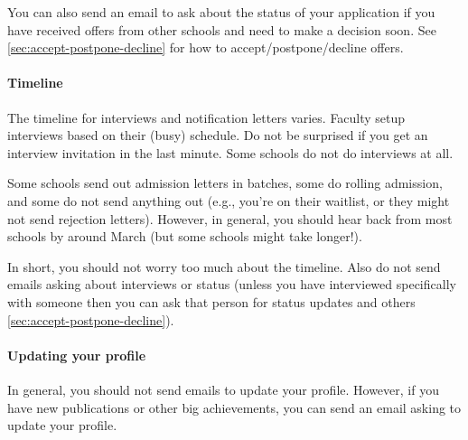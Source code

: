 \documentclass[oneside,11pt]{book}
\begin{document}
You can also send an email to ask about the status of your application if you have received offers from other schools and need to make a decision soon. See \autoref{sec:accept-postpone-decline} for how to accept/postpone/decline offers.

\paragraph{Timeline} The timeline for interviews and notification letters varies.  Faculty setup interviews based on their (busy) schedule. Do not be surprised if you get an interview invitation in the last minute. Some schools do not do interviews at all.

Some schools send out admission letters in batches, some do rolling admission, and some do not send anything out (e.g., you're on their waitlist, or they might not send rejection letters).  However, in general, you should hear back from most schools by around March (but some schools might take longer!).

In short, you should not worry too much about the timeline. Also do not send emails asking about interviews or status (unless you have interviewed specifically with someone then you can ask that person for status updates and others \autoref{sec:accept-postpone-decline}).

\paragraph{Updating your profile} In general, you should not send emails to update your profile.  However, if you have new publications or other big achievements, you can send an email asking to update your profile.




\end{document}

